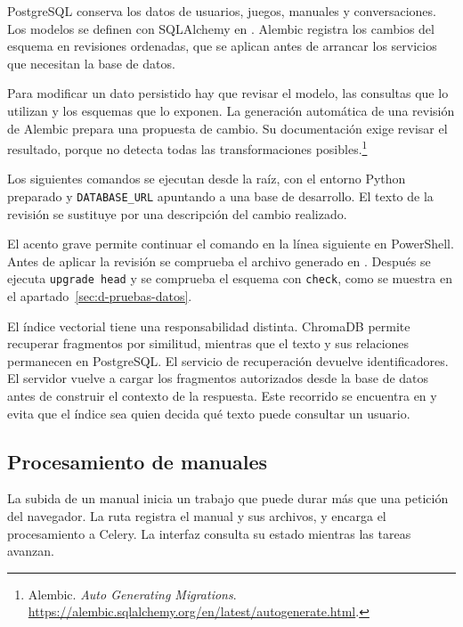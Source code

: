PostgreSQL conserva los datos de usuarios, juegos, manuales y conversaciones. Los modelos se definen con SQLAlchemy en . Alembic registra los cambios del esquema en revisiones ordenadas, que se aplican antes de arrancar los servicios que necesitan la base de datos.

Para modificar un dato persistido hay que revisar el modelo, las consultas que lo utilizan y los esquemas que lo exponen. La generación automática de una revisión de Alembic prepara una propuesta de cambio. Su documentación exige revisar el resultado, porque no detecta todas las transformaciones posibles.\footnote{Alembic. \emph{Auto Generating Migrations}. \url{https://alembic.sqlalchemy.org/en/latest/autogenerate.html}.}

Los siguientes comandos se ejecutan desde la raíz, con el entorno Python preparado y \texttt{DATABASE\_URL} apuntando a una base de desarrollo. El texto de la revisión se sustituye por una descripción del cambio realizado.


El acento grave permite continuar el comando en la línea siguiente en PowerShell. Antes de aplicar la revisión se comprueba el archivo generado en . Después se ejecuta \texttt{upgrade head} y se comprueba el esquema con \texttt{check}, como se muestra en el apartado~\ref{sec:d-pruebas-datos}.

El índice vectorial tiene una responsabilidad distinta. ChromaDB permite recuperar fragmentos por similitud, mientras que el texto y sus relaciones permanecen en PostgreSQL. El servicio de recuperación devuelve identificadores. El servidor vuelve a cargar los fragmentos autorizados desde la base de datos antes de construir el contexto de la respuesta. Este recorrido se encuentra en  y evita que el índice sea quien decida qué texto puede consultar un usuario.

\subsection{Procesamiento de manuales}

La subida de un manual inicia un trabajo que puede durar más que una petición del navegador. La ruta registra el manual y sus archivos, y encarga el procesamiento a Celery. La interfaz consulta su estado mientras las tareas avanzan.


